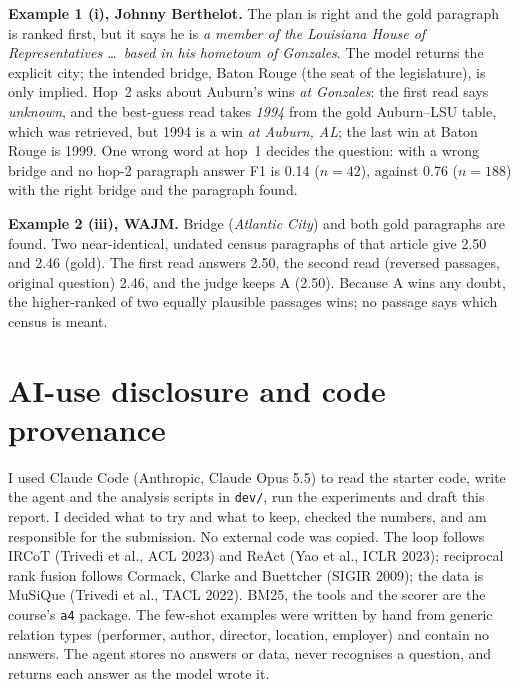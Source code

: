 \documentclass[10pt,a4paper]{article}
\begin{document}
\textbf{Example 1 (i), Johnny Berthelot.} The plan is right and the gold paragraph is ranked first, but it says
he is \emph{a member of the Louisiana House of Representatives \dots\ based in his hometown of Gonzales}. The model
returns the explicit city; the intended bridge, Baton Rouge (the seat of the legislature), is only implied. Hop~2
asks about Auburn's wins \emph{at Gonzales}: the first read says \emph{unknown}, and the best-guess read takes
\emph{1994} from the gold Auburn--LSU table, which was retrieved, but 1994 is a win \emph{at Auburn, AL}; the last
win at Baton Rouge is 1999. One wrong word at hop~1 decides the question: with a wrong bridge and no hop-2 paragraph answer F1 is
0.14 ($n{=}42$), against 0.76 ($n{=}188$) with the right bridge and the paragraph found.

\textbf{Example 2 (iii), WAJM.} Bridge (\emph{Atlantic City}) and both gold paragraphs are found. Two
near-identical, undated census paragraphs of that article give 2.50 and 2.46 (gold). The first read answers 2.50,
the second read (reversed passages, original question) 2.46, and the judge keeps A (2.50). Because A wins any
doubt, the higher-ranked of two equally plausible passages wins; no passage says which census is meant.

\section{AI-use disclosure and code provenance}
I used Claude Code (Anthropic, Claude Opus 5.5) to read the starter code, write the agent and the analysis
scripts in \texttt{dev/}, run the experiments and draft this report. I decided what to try and what to keep,
checked the numbers, and am responsible for the submission. No external code was copied. The loop follows IRCoT
(Trivedi et al., ACL 2023) and ReAct (Yao et al., ICLR 2023); reciprocal rank fusion follows Cormack, Clarke and
Buettcher (SIGIR 2009); the data is MuSiQue (Trivedi et al., TACL 2022). BM25, the tools and the scorer are the
course's \texttt{a4} package. The few-shot examples were written by hand from generic relation types (performer, author,
director, location, employer) and contain no answers. The agent stores no answers or data, never recognises a
question, and returns each answer as the model wrote it.
\end{document}
